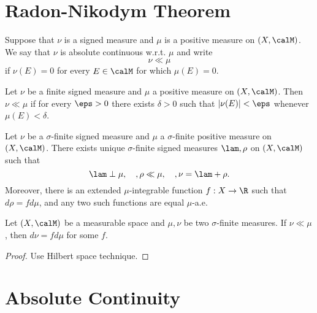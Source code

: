 \section{Radon-Nikodym Theorem}
\begin{definition}
    Suppose that $\nu$ is a signed measure and $\mu$ is a positive measure on $(X, \calM)$. We say that $\nu$ is absolute continuous w.r.t. $\mu$ and write 
    $$\nu \ll \mu$$
    if $\nu(E)=0$ for every $E \in \calM$ for which $\mu(E)=0$. 
\end{definition}
\begin{theorem}
    Let $\nu$ be a finite signed measure and $\mu$ a positive measure on $(X, \calM)$. Then $\nu \ll \mu$ if for every $\eps>0$ there exists $\delta>0$ such that $|\nu(E)|<\eps$ whenever $\mu(E)<\delta$. 
\end{theorem}
\begin{theorem}
    Let $\nu$ be a $\sigma$-finite signed measure and $\mu$ a $\sigma$-finite positive measure on $(X, \calM)$. There exists unique $\sigma$-finite signed measures $\lam, \rho$ on $(X, \calM)$ such that 
    $$\lam \perp \mu, \quad, \rho \ll \mu, \quad, \nu = \lam + \rho. $$
    Moreover, there is an extended $\mu$-integrable function $f:X \to \R$ such that $d\rho=fd\mu$, and any two such functions are equal $\mu$-a.e.
\end{theorem}
\begin{theorem}
    Let $(X, \calM)$ be a measurable space and $\mu, \nu$ be two $\sigma$-finite measures. If $\nu \ll \mu$, then 
    $d\nu=fd\mu$ for some $f$. 
\end{theorem}
\begin{proof}
    Use Hilbert space technique.
\end{proof}
\section{Absolute Continuity}
